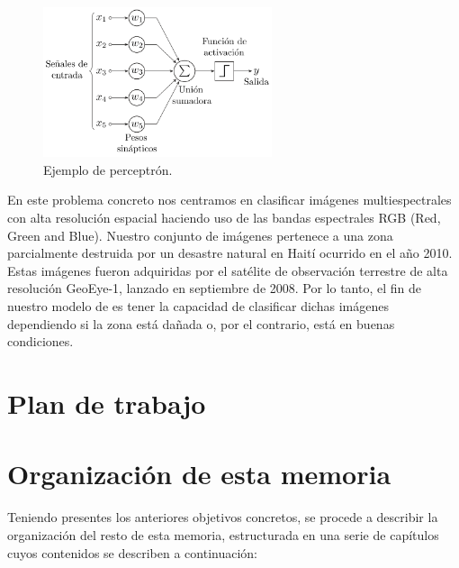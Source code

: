 \begin{figure}[H]
    \centering
    \includegraphics[width=0.6\textwidth]{images/chapter1/perceptron.png}
    \caption{Ejemplo de perceptrón.}
    \label{fig:Perceptrón}
\end{figure}

En este problema concreto nos centramos en clasificar imágenes multiespectrales con alta resolución espacial haciendo uso de las bandas espectrales RGB (Red, Green and Blue).
Nuestro conjunto de imágenes pertenece a una zona parcialmente destruida por un desastre natural en Haití ocurrido en el año 2010.
Estas imágenes fueron adquiridas por el satélite de observación terrestre de alta resolución GeoEye-1, lanzado en septiembre de 2008.
Por lo tanto, el fin de nuestro modelo de  es tener la capacidad de clasificar dichas imágenes dependiendo si la zona está dañada o, por el contrario, está en buenas condiciones.

\section{Plan de trabajo}\label{sec:plan-de-trabajo}

\section{Organización de esta memoria}\label{sec:organización-de-esta-memoria}

Teniendo presentes los anteriores objetivos concretos, se procede a describir la organización del resto de esta memoria, estructurada en una serie de capítulos cuyos contenidos se
describen a continuación:

